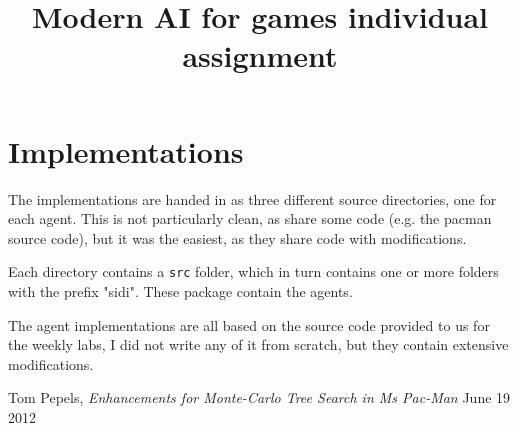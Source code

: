 \documentclass[conference,compsoc]{IEEEtran}
\begin{document}
\title{Modern AI for games individual assignment}
\author{
}
\maketitle
\IEEEpeerreviewmaketitle









\section{Implementations}
The implementations are handed in as three different source directories, one for
each agent. This is not particularly clean, as share some code (e.g. the pacman
source code), but it was the easiest, as they share code with modifications.

Each directory contains a \texttt{src} folder, which in turn contains one or
more folders with the prefix "sidi". These package contain the agents.

The agent implementations are all based on the source code provided to us for
the weekly labs, I did not write any of it from scratch, but they contain
extensive modifications.

\begin{thebibliography}{1}
Tom Pepels, \emph{Enhancements for Monte-Carlo Tree Search in Ms Pac-Man} June 19 2012
\end{thebibliography}
\end{document}
